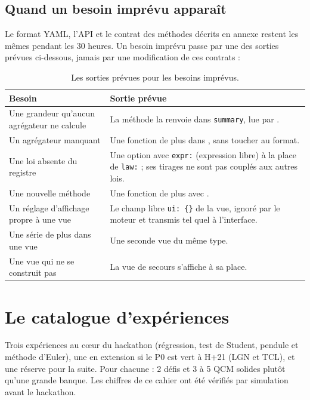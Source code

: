 \documentclass[11pt,a4paper]{article}
\begin{document}
\subsection{Quand un besoin imprévu apparaît}\label{sec:imprevu}
Le format YAML, l'API et le contrat des méthodes décrits en annexe restent les mêmes pendant les 30 heures. Un besoin imprévu passe par une des sorties prévues ci-dessous, jamais par une modification de ces contrats :

\begin{table}[H]
  \centering
  \small
  \begin{tabularx}{\textwidth}{@{}L{5.6cm} Y@{}}
    \toprule
    \textbf{Besoin} & \textbf{Sortie prévue} \\
    \midrule
    Une grandeur qu'aucun agrégateur ne calcule & La méthode la renvoie dans \texttt{summary}, lue par . \\
    Un agrégateur manquant & Une fonction de plus dans , sans toucher au format. \\
    Une loi absente du registre & Une option avec \texttt{expr:} (expression libre) à la place de \texttt{law:} ; ses tirages ne sont pas couplés aux autres lois. \\
    Une nouvelle méthode & Une fonction de plus avec . \\
    Un réglage d'affichage propre à une vue & Le champ libre \texttt{ui: \{\}} de la vue, ignoré par le moteur et transmis tel quel à l'interface. \\
    Une série de plus dans une vue & Une seconde vue du même type. \\
    Une vue qui ne se construit pas & La vue de secours  s'affiche à sa place. \\
    \bottomrule
  \end{tabularx}
  \caption{Les sorties prévues pour les besoins imprévus.}
\end{table}

\section{Le catalogue d'expériences}

\begin{enbref}
Trois expériences au cœur du hackathon (régression, test de Student, pendule et méthode d'Euler), une en extension si le P0 est vert à H+21 (LGN et TCL), et une réserve pour la suite. Pour chacune : 2 défis et 3 à 5 QCM solides plutôt qu'une grande banque. Les chiffres de ce cahier ont été vérifiés par simulation avant le hackathon.
\end{enbref}
\end{document}
